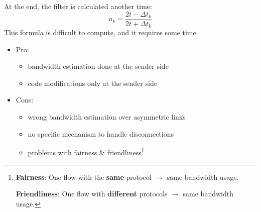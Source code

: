 At the end, the filter is calculated another time:
\begin{equation}
a_k = \frac{2t - \Delta t_k}{2t + \Delta t_k}
\end{equation}
This formula is difficult to compute, and it requires some time.
\begin{itemize}
\item Pro:
  \begin{itemize}
    \item bandwidth estimation done at the sender side
    \item code modifications only at the sender side
  \end{itemize}
\item Cons:
  \begin{itemize}
  \item wrong bandwidth estimation over asymmetric links
  \item no specific mechanism to handle disconnections
  \item problems with fairness \& friendliness\footnote{\textbf{Fairness}:
    One flow with the \textbf{same} protocol $\rightarrow$ same
    bandwidth usage.
    
    \textbf{Friendliness}: One flow with \textbf{different} protocols
    $\rightarrow$ same bandwidth usage.}
  \end{itemize}
\end{itemize}
